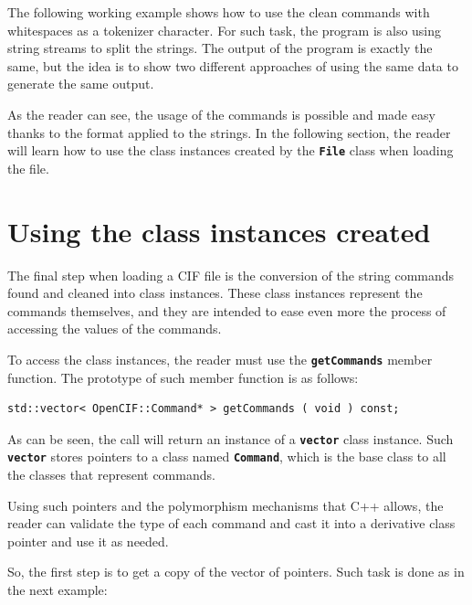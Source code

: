 \documentclass[11pt,twoside,openany,x11names,svgnames]{memoir}
\begin{document}
The following working example shows how to use the clean commands with whitespaces as a tokenizer character. For such task, the program is also using string streams to split the strings. The output of the program is exactly the same, but the idea is to show two different approaches of using the same data to generate the same output.



As the reader can see, the usage of the commands is possible and made easy thanks to the format applied to the strings. In the following section, the reader will learn how to use the class instances created by the \textbf{\texttt{File}} class when loading the file.

\section{Using the class instances created}\label{Using-the-class-instances-created}

The final step when loading a CIF file is the conversion of the string commands found and cleaned into class instances. These class instances represent the commands themselves, and they are intended to ease even more the process of accessing the values of the commands.

To access the class instances, the reader must use the \textbf{\texttt{getCommands}} member function. The prototype of such member function is as follows:

\begin{lstlisting}[frame=single,style=CPPStyle]
std::vector< OpenCIF::Command* > getCommands ( void ) const;
\end{lstlisting}

As can be seen, the call will return an instance of a \textbf{\texttt{vector}} class instance. Such \textbf{\texttt{vector}} stores pointers to a class named \textbf{\texttt{Command}}, which is the base class to all the classes that represent commands.

Using such pointers and the polymorphism mechanisms that C++ allows, the reader can validate the type of each command and cast it into a derivative class pointer and use it as needed.

So, the first step is to get a copy of the vector of pointers. Such task is done as in the next example:
\end{document}
